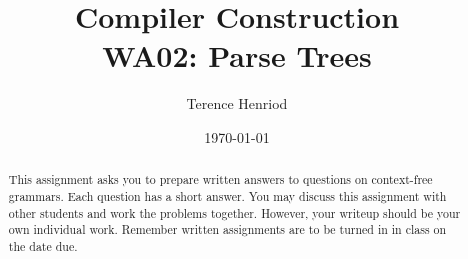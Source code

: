 \documentclass[fleqn]{article}
\title{Compiler Construction \\ WA02: Parse Trees}
\author{Terence Henriod}
\date{\today}
\begin{document}
\clearpage            %
\maketitle            %
\thispagestyle{empty} %

\begin{abstract}
\noindent This assignment asks you to prepare written answers to questions on context-free grammars.
Each question has a short answer. You may discuss this assignment with other
students and work the problems together. However, your writeup should be your own individual
work. Remember written assignments are to be turned in in class on the date
due.
\end{abstract}

\newpage
\end{document}
